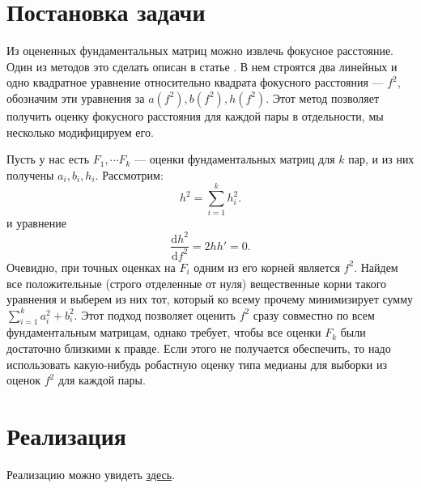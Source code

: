 \label{focal}
\section{Постановка задачи}
Из оцененных фундаментальных матриц можно извлечь фокусное расстояние. Один из методов это сделать описан в статье \cite{Sturm:2005:FLC:1090456.1649082}. В нем строятся два линейных и одно квадратное уравнение относительно квадрата фокусного расстояния --- $f^2$, обозначим эти уравнения за $a\left(f^2\right), b\left(f^2\right), h\left(f^2\right)$. Этот метод позволяет получить  оценку фокусного расстояния для каждой пары в отдельности, мы несколько модифицируем его. 

Пусть у нас есть $F_1, \cdots F_k$ --- оценки фундаментальных матриц для $k$ пар, и из них получены $a_i, b_i, h_i$. 
Рассмотрим:
\begin{equation}
	h^2 = \sum\limits_{i=1}^{k} h^2_i.
\end{equation} 
и уравнение 
\begin{equation}
	\frac{\mathrm{d} h^2}{\mathrm{d}f^2} = 2hh' = 0.
\end{equation} 
Очевидно, при точных оценках на $F_i$  одним из его корней является $f^2$. Найдем все положительные (строго отделенные от нуля) вещественные корни такого уравнения и выберем из них тот, который ко всему прочему минимизирует сумму $\sum\limits_{i=1}^{k} a_i^2 + b_i^2$. Этот подход позволяет оценить $f^2$ сразу совместно по всем фундаментальным матрицам, однако требует, чтобы все оценки $F_k$ были достаточно близкими к правде. Если этого не получается обеспечить, то надо использовать какую-нибудь робастную оценку типа медианы для выборки из оценок $f^2$ для каждой пары.
\section{Реализация}
Реализацию можно увидеть \href{https://github.com/QuantumMechanicus/camera_calibration_test/blob/dev/subroutines/focal_length_estimator/Focal_Estimator.cpp}{здесь}.
